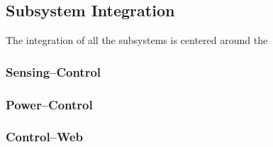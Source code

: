 \subsection{Subsystem Integration}
\label{sec:subsystem_integration}
The integration of all the subsystems is centered around the 

\subsubsection{Sensing--Control}

\subsubsection{Power--Control}

\subsubsection{Control--Web}